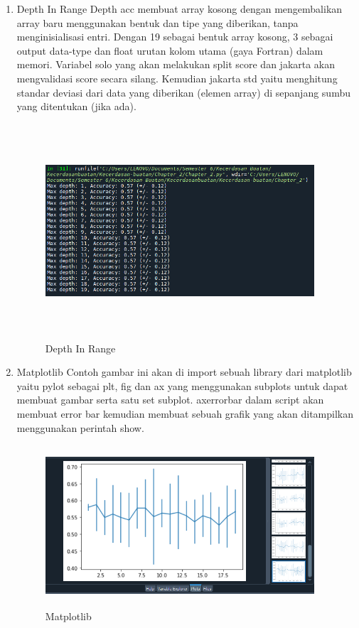 \begin{enumerate}
\item Depth In Range
\newline Depth acc membuat array kosong dengan mengembalikan array baru menggunakan bentuk dan tipe yang diberikan, tanpa menginisialisasi entri. Dengan 19 sebagai bentuk array kosong, 3 sebagai output data-type dan float urutan kolom utama (gaya Fortran) dalam memori. Variabel solo yang akan melakukan
split score dan jakarta akan mengvalidasi score secara silang. Kemudian jakarta std yaitu menghitung standar deviasi dari data yang diberikan (elemen array) di sepanjang sumbu yang ditentukan (jika ada).
\begin{figure}[!htbp]
	\centering
	\includegraphics[width=10cm,height=8cm]{figures/Cp2-j.png}
	\caption{Depth In Range}
	\label{penanda}
\end{figure}

\item Matplotlib
\newline Contoh gambar ini akan di import sebuah library dari matplotlib yaitu pylot sebagai plt, fig dan ax yang menggunakan subplots untuk dapat membuat gambar serta satu set subplot. axerrorbar dalam script akan membuat error bar kemudian membuat sebuah grafik yang akan ditampilkan menggunakan perintah show.
\begin{figure}[!htbp]
	\centering
	\includegraphics[width=10cm,height=6cm]{figures/Cp2-k.png}
	\caption{Matplotlib}
	\label{penanda}
\end{figure}
\end{enumerate}